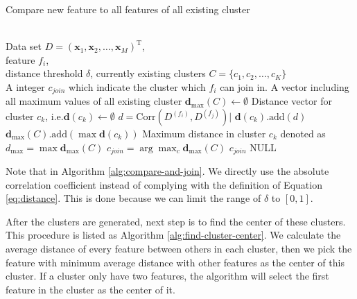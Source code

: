 \documentclass{ieeeaccess}
\theoremstyle{definition}
\begin{document}
\begin{algorithm}
\caption{Compare new feature to all features of all existing cluster}
\label{alg:compare-and-join}
\begin{algorithmic}[1]
\REQUIRE ~~\\
    Data set $D=(\bm{x}_1,\bm{x}_2,\ldots,\bm{x}_M)^\text{T}$, \\
    feature $f_i$, \\
    distance threshold $\delta$,
    currently existing clusters $C=\{c_1, c_2, \ldots, c_K\}$
\ENSURE ~~\\
    A integer $c_{join}$ which indicate the cluster which $f_i$ can join in.  
\STATE A vector including all maximum values of all existing cluster $\bm{d}_{\max}(C) \gets \emptyset$
    \STATE Distance vector for cluster $c_k$, i.e.$\bm{d}(c_k) \gets \emptyset$
        \STATE $d=\text{Corr}(D^{(f_i)}, D^{(f_j)})|$
        \STATE $\bm{d}(c_k)\text{.add}(d)$
    \ENDFOR
    \STATE $\bm{d}_{\max}(C)\text{.add}(\max{\bm{d}(c_k)})$
\ENDFOR
\STATE Maximum distance in cluster $c_k$ denoted as $d_{\max}=\max{\bm{d}_{\max}(C)}$
    \STATE $c_{join}=\arg\max_c{\bm{d}_{\max}(C)}$
    \RETURN $c_{join}$
\ELSE
    \RETURN NULL
\ENDIF
\end{algorithmic}
\end{algorithm}

Note that in Algorithm \ref{alg:compare-and-join}. We directly use the absolute correlation coefficient instead of complying with the definition of Equation \ref{eq:distance}. This is done because we can limit the range of $\delta$ to $[0,1]$.

After the clusters are generated, next step is to find the center of these clusters. This procedure is listed as Algorithm \ref{alg:find-cluster-center}. We calculate the average distance of every feature between others in each cluster, then we pick the feature with minimum average distance with other features as the center of this cluster. If a cluster only have two features, the algorithm will select the first feature in the cluster as the center of it.
\end{document}
